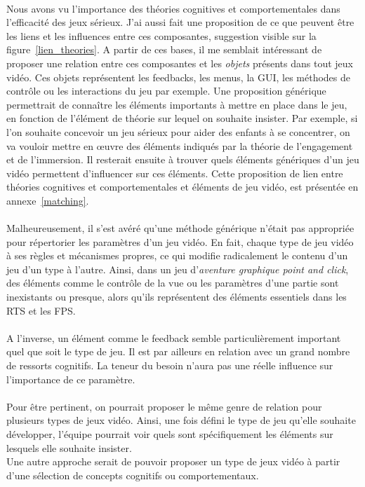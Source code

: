 			\paragraph{}
Nous avons vu l'importance des théories cognitives et comportementales dans l'efficacité des jeux sérieux. J'ai aussi fait une proposition de ce que peuvent être les liens et les influences entre ces composantes, suggestion visible sur la figure~\ref{lien_theories}. A partir de ces bases, il me semblait intéressant de proposer une relation entre ces composantes et les \emph{objets} présents dans tout jeux vidéo. Ces objets représentent les feedbacks, les menus, la GUI, les méthodes de contrôle ou les interactions du jeu par exemple. Une proposition générique permettrait de connaître les éléments importants à mettre en place dans le jeu, en fonction de l'élément de théorie sur lequel on souhaite insister. Par exemple, si l'on souhaite concevoir un jeu sérieux pour aider des enfants à se concentrer, on va vouloir mettre en œuvre des éléments indiqués par la théorie de l'engagement et de l'immersion. Il resterait ensuite à trouver quels éléments génériques d'un jeu vidéo permettent d'influencer sur ces éléments.
Cette proposition de lien entre théories cognitives et comportementales et éléments de jeu vidéo, est présentée en annexe~\ref{matching}.

\paragraph{}Malheureusement, il s'est avéré qu'une méthode générique n'était pas appropriée pour répertorier les paramètres d'un jeu vidéo. En fait, chaque type de jeu vidéo à ses règles et mécanismes propres, ce qui modifie radicalement le contenu d'un jeu d'un type à l'autre. Ainsi, dans un jeu d'\emph{aventure graphique point and click}, des éléments comme le contrôle de la vue ou les paramètres d'une partie sont inexistants ou presque, alors qu'ils représentent des éléments essentiels dans les RTS et les FPS.
\paragraph{}A l'inverse, un élément comme le feedback semble particulièrement important quel que soit le type de jeu. Il est par ailleurs en relation avec un grand nombre de ressorts cognitifs. La teneur du besoin n'aura pas une réelle influence sur l'importance de ce paramètre.

\paragraph{}Pour être pertinent, on pourrait proposer le même genre de relation pour plusieurs types de jeux vidéo. Ainsi, une fois défini le type de jeu qu'elle souhaite développer, l'équipe pourrait voir quels sont spécifiquement les éléments sur lesquels elle souhaite insister. \\
Une autre approche serait de pouvoir proposer un type de jeux vidéo à partir d'une sélection de concepts cognitifs ou comportementaux.

